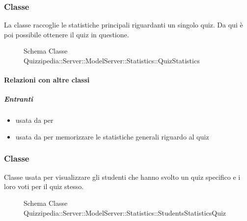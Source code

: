\subsubsection{Classe }
La classe raccoglie le statistiche principali riguardanti un singolo quiz. Da qui è poi possibile ottenere il quiz in questione.
\begin{figure}[H]
\centering
\noindent{}
\caption[Schema Classe QuizStatistics]{Schema Classe Quizzipedia::Server::ModelServer::Statistics::QuizStatistics}
\end{figure}
\paragraph{Relazioni con altre classi}
\subparagraph{Entranti}
\begin{itemize}
\item usata da  per 
\item usata da  per memorizzare le statistiche generali riguardo al quiz
\end{itemize}
\subsubsection{Classe }
Classe usata per visualizzare gli studenti che hanno svolto un quiz specifico e i loro voti per il quiz stesso.
\begin{figure}[H]
\centering
\noindent{}
\caption[Schema Classe StudentsStatisticsQuiz]{Schema Classe Quizzipedia::Server::ModelServer::Statistics::StudentsStatisticsQuiz}
\end{figure}
